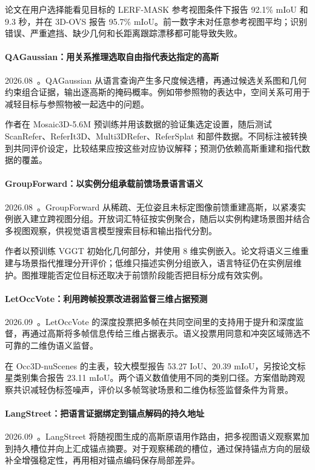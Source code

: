 论文在用户选择能看见目标的 LERF-MASK 参考视图条件下报告 92.1\% mIoU 和 9.3 秒，并在 3D-OVS 报告 95.7\% mIoU。前一数字未对任意参考视图平均；识别错误、严重遮挡、缺少几何和长距离跟踪漂移都可能导致失败。

\paragraph{QAGaussian：用关系推理选取自由指代表达指定的高斯}
2026.08~\cite{2608_16103}。QAGaussian 从语言查询产生多尺度候选槽，再通过候选关系图和几何约束组合证据，输出逐高斯的掩码概率。例如带参照物的表达中，空间关系可用于减轻目标与参照物被一起选中的问题。

作者在 Mosaic3D-5.6M 预训练并用该数据的验证集选定设置，随后测试 ScanRefer、ReferIt3D、Multi3DRefer、ReferSplat 和部件数据。不同标注被转换到共同评价设定，比较结果应按这些对应协议解释；预测仍依赖高斯重建和指代数据的覆盖。

\paragraph{GroupForward：以实例分组承载前馈场景语言语义}
2026.08~\cite{2608_17535}。GroupForward 从稀疏、无位姿且未标定图像前馈重建高斯，以紧凑实例嵌入建立跨视图分组。开放词汇特征按实例聚合，随后以实例构建场景图并结合多视图观察，供视觉语言模型搜索目标和输出指代分割。

作者以预训练 VGGT 初始化几何部分，并使用 8 维实例嵌入。论文将语义三维重建与场景指代推理分开评价；低维只描述实例分组嵌入，语言特征仍在实例层维护。图推理能否定位目标还取决于前馈阶段能否把目标分成有效实例。

\paragraph{LetOccVote：利用跨帧投票改进弱监督三维占据预测}
2026.09~\cite{2609_04846}。LetOccVote 的深度投票把多帧在共同空间里的支持用于提升和深度监督，再通过高斯将多帧信息传给三维占据表示。语义投票用同意和冲突区域筛选不可靠的二维伪语义监督。

在 Occ3D-nuScenes 的主表，较大模型报告 53.27 IoU、20.39 mIoU，另按论文标星类别集合报告 23.11 mIoU。两个语义数值使用不同的类别口径。方案借助跨观察共识减轻伪标签噪声，评价以多帧驾驶场景和二维伪标签监督条件为背景。

\paragraph{LangStreet：把语言证据绑定到锚点解码的持久地址}
2026.09~\cite{2609_11616}。LangStreet 将随视图生成的高斯原语用作路由，把多视图语义观察累加到持久槽位并向上汇成锚点摘要。对于观察稀疏的槽位，通过保持锚点方向的层级补全增强稳定性，再用相对锚点编码保存局部差异。

